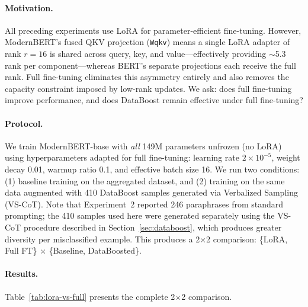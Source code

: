 \documentclass[11pt]{article}
\begin{document}
\paragraph{Motivation.}
All preceding experiments use LoRA for parameter-efficient fine-tuning. However, ModernBERT's fused QKV projection (\texttt{Wqkv}) means a single LoRA adapter of rank $r=16$ is shared across query, key, and value---effectively providing $\sim$5.3 rank per component---whereas BERT's separate projections each receive the full rank. Full fine-tuning eliminates this asymmetry entirely and also removes the capacity constraint imposed by low-rank updates. We ask: does full fine-tuning improve performance, and does DataBoost remain effective under full fine-tuning?

\paragraph{Protocol.}
We train ModernBERT-base with \emph{all} 149M parameters unfrozen (no LoRA) using hyperparameters adapted for full fine-tuning: learning rate $2 \times 10^{-5}$, weight decay 0.01, warmup ratio 0.1, and effective batch size 16. We run two conditions: (1) baseline training on the aggregated dataset, and (2) training on the same data augmented with 410 DataBoost samples generated via Verbalized Sampling (VS-CoT). Note that Experiment~2 reported 246 paraphrases from standard prompting; the 410 samples used here were generated separately using the VS-CoT procedure described in Section~\ref{sec:databoost}, which produces greater diversity per misclassified example. This produces a 2$\times$2 comparison: \{LoRA, Full FT\} $\times$ \{Baseline, DataBoosted\}.

\paragraph{Results.}
Table~\ref{tab:lora-vs-full} presents the complete 2$\times$2 comparison.
\end{document}

